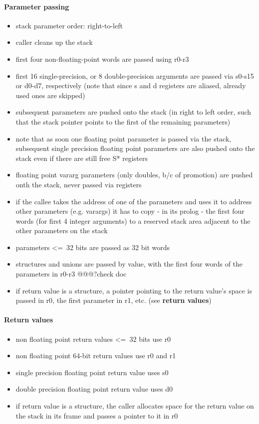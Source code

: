 \paragraph{Parameter passing}

\begin{itemize}
\item stack parameter order: right-to-left
\item caller cleans up the stack
\item first four non-floating-point words are passed using r0-r3
\item first 16 single-precision, or 8 double-precision arguments are passed via s0-s15 or d0-d7, respectively (note that since s and d registers are aliased, already used ones are skipped)
\item subsequent parameters are pushed onto the stack (in right to left order, such that the stack pointer points to the first of the remaining parameters)
\item note that as soon one floating point parameter is passed via the stack, subsequent single precision floating point parameters are also pushed onto the stack even if there are still free S* registers
\item floating point vararg parameters (only doubles, b/c of promotion) are pushed onth the stack, never passed via registers
\item if the callee takes the address of one of the parameters and uses it to address other parameters (e.g. varargs) it has to copy - in its prolog - the first four words (for first 4 integer arguments) to a reserved stack area adjacent to the other parameters on the stack
\item parameters \textless=\ 32 bits are passed as 32 bit words
\item structures and unions are passed by value, with the first four words of the parameters in r0-r3 @@@?check doc
\item if return value is a structure, a pointer pointing to the return value's space is passed in r0, the first parameter in r1, etc. (see {\bf return values})
\end{itemize}

\paragraph{Return values}
\begin{itemize}
\item non floating point return values \textless=\ 32 bits use r0
\item non floating point 64-bit return values use r0 and r1
\item single precision floating point return value uses s0
\item double precision floating point return value uses d0
\item if return value is a structure, the caller allocates space for the return value on the stack in its frame and passes a pointer to it in r0
\end{itemize}




